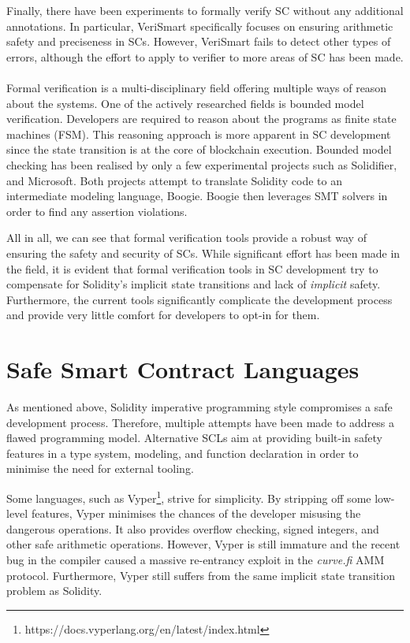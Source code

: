 \documentclass[oneside]{ecsproject}     %
\begin{document}
Finally, there have been experiments to formally verify SC without any additional annotations. In particular, VeriSmart specifically
focuses on ensuring arithmetic safety and preciseness in SCs\cite{so2019verismart}. However, VeriSmart fails to detect other types of errors, 
although the effort to apply to verifier to more areas of SC has been made.

\paragraph*{}
Formal verification is a multi-disciplinary field offering multiple ways of reason about the systems. One of the actively researched fields
is bounded model verification\cite{SMBC}. Developers are required to reason about the programs as finite state machines (FSM).
This reasoning approach is more apparent in SC development since the state transition is at the core of blockchain execution.
Bounded model checking has been realised by only a few experimental projects such as Solidifier\cite{solidifer}, and Microsoft\cite{azure}.
Both projects attempt to translate Solidity code to an intermediate modeling language, Boogie\cite{boogie}. Boogie then leverages
SMT solvers in order to find any assertion violations.

All in all, we can see that formal verification tools provide a robust way of ensuring the safety and security of SCs. 
While significant effort has been made in the field, it is evident that formal verification tools in SC development
try to compensate for Solidity's implicit state transitions and lack of \textit{implicit} safety. 
Furthermore, the current tools significantly complicate the development process and provide very little comfort
for developers to opt-in for them.

\section{Safe Smart Contract Languages} \label{Chapter:SCL}

As mentioned above, Solidity imperative programming style compromises a safe development process. Therefore,
multiple attempts have been made to address a flawed programming model\cite{sc_survey}. Alternative SCLs aim at providing
built-in safety features in a type system, modeling, and function declaration in order to minimise the need for
external tooling. 

Some languages, such as Vyper\footnote{https://docs.vyperlang.org/en/latest/index.html}, strive for simplicity.
By stripping off some low-level features, Vyper minimises the chances of the developer misusing the dangerous operations.
It also provides overflow checking, signed integers, and other safe arithmetic operations. However, Vyper is still immature 
and the recent bug in the compiler caused a massive re-entrancy exploit in the \textit{curve.fi} AMM protocol\cite{curve}.
Furthermore, Vyper still suffers from the same implicit state transition problem as Solidity.
\end{document}
